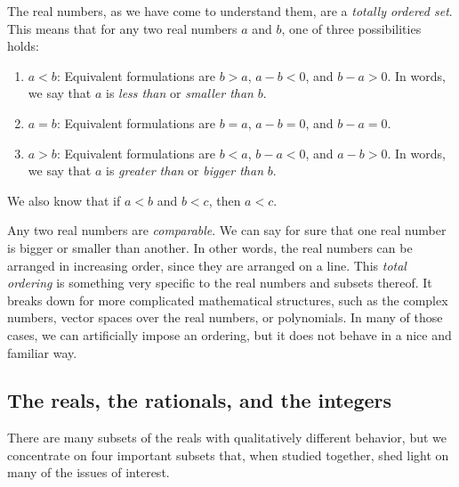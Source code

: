 \documentclass{amsart}
\begin{document}
The real numbers, as we have come to understand them, are a {\em
totally ordered set}. This means that for any two real numbers $a$ and
$b$, one of three possibilities holds:

\begin{enumerate}
\item $a < b$: Equivalent formulations are $b > a$, $a - b < 0$, and
  $b - a > 0$. In words, we say that $a$ is {\em less than} or {\em
  smaller than} $b$.
\item $a = b$: Equivalent formulations are $b = a$, $a - b = 0$, and
  $b - a = 0$.
\item $a > b$: Equivalent formulations are $b < a$, $b - a < 0$, and
  $a - b > 0$. In words, we say that $a$ is {\em greater than} or {\em
  bigger than} $b$.
\end{enumerate}

We also know that if $a < b$ and $b < c$, then $a < c$.

Any two real numbers are {\em comparable}. We can say for sure that
one real number is bigger or smaller than another. In other words, the
real numbers can be arranged in increasing order, since they are
arranged on a line. This {\em total ordering} is something very
specific to the real numbers and subsets thereof. It breaks down for
more complicated mathematical structures, such as the complex numbers,
vector spaces over the real numbers, or polynomials. In many of those
cases, we can artificially impose an ordering, but it does not behave
in a nice and familiar way.

\subsection{The reals, the rationals, and the integers}

There are many subsets of the reals with qualitatively different
behavior, but we concentrate on four important subsets that, when
studied together, shed light on many of the issues of interest.
\end{document}
